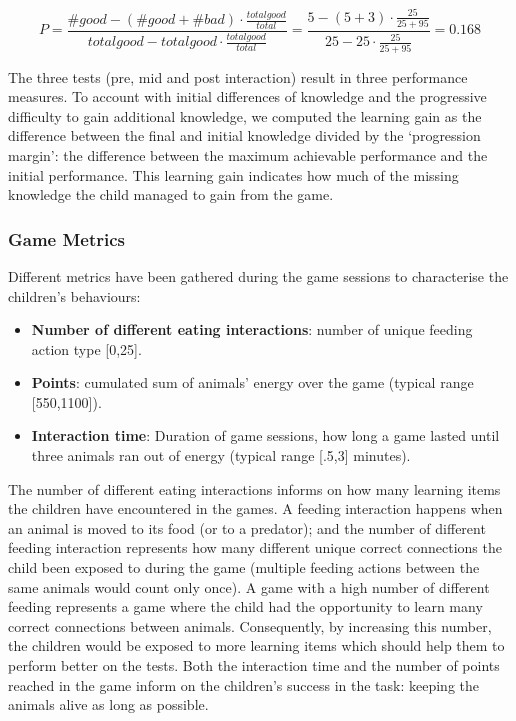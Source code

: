 \begin{equation}
P=\frac{\#good-(\#good+\#bad) \cdot \frac{total good}{total}}{total good - total good \cdot \frac{total good}{total}} = \frac{5-(5+3) \cdot \frac{25}{25+95}}{25 - 25 \cdot \frac{25}{25+95}}=0.168
\end{equation}
			
The three tests (pre, mid and post interaction) result in three performance measures. To account with initial differences of knowledge and the progressive difficulty to gain additional knowledge, we computed the learning gain as the difference between the final and initial knowledge divided by the `progression margin': the difference between the maximum achievable performance and the initial performance. This learning gain indicates how much of the missing knowledge the child managed to gain from the game.
			
\subsubsection{Game Metrics}
Different metrics have been gathered during the game sessions to characterise the children's behaviours:
\begin{itemize}
	\item \textbf{Number of different eating interactions}: number of unique feeding action type [0,25].
	\item \textbf{Points}: cumulated sum of animals' energy over the game (typical range [550,1100]).
	\item \textbf{Interaction time}: Duration of game sessions, how long a game lasted until three animals ran out of energy (typical range [.5,3] minutes).
\end{itemize}

The number of different eating interactions informs on how many learning items the children have encountered in the games. A feeding interaction happens when an animal is moved to its food (or to a predator); and the number of different feeding interaction represents how many different unique correct connections the child been exposed to during the game (multiple feeding actions between the same animals would count only once). A game with a high number of different feeding represents a game where the child had the opportunity to learn many correct connections between animals. Consequently, by increasing this number, the children would be exposed to more learning items which should help them to perform better on the tests. Both the interaction time and the number of points reached in the game inform on the children's success in the task: keeping the animals alive as long as possible. 

